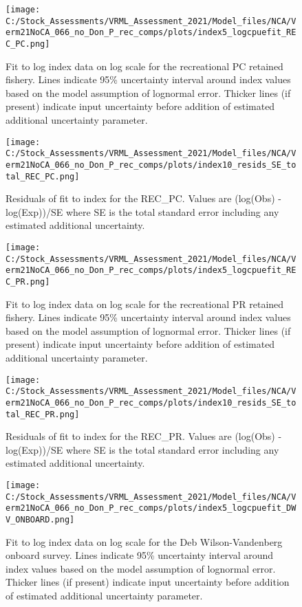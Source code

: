 \documentclass[11pt,
  english,
  a4paper,
]{article}
\begin{document}
\begin{figure}
\centering
\texttt{[image: C:/Stock\_Assessments/VRML\_Assessment\_2021/Model\_files/NCA/Verm21NoCA\_066\_no\_Don\_P\_rec\_comps/plots/index5\_logcpuefit\_REC\_PC.png]}
\caption{Fit to log index data on log scale for the recreational PC retained fishery. Lines indicate 95\% uncertainty interval around index values based on the model assumption of lognormal error. Thicker lines (if present) indicate input uncertainty before addition of estimated additional uncertainty parameter.\label{fig:log-cpue-REC-PC}}
\end{figure}

\begin{figure}
\centering
\texttt{[image: C:/Stock\_Assessments/VRML\_Assessment\_2021/Model\_files/NCA/Verm21NoCA\_066\_no\_Don\_P\_rec\_comps/plots/index10\_resids\_SE\_total\_REC\_PC.png]}
\caption{Residuals of fit to index for the REC\_PC. Values are (log(Obs) - log(Exp))/SE where SE is the total standard error including any estimated additional uncertainty.\label{fig:cpue-resid-REC-PC}}
\end{figure}

\begin{figure}
\centering
\texttt{[image: C:/Stock\_Assessments/VRML\_Assessment\_2021/Model\_files/NCA/Verm21NoCA\_066\_no\_Don\_P\_rec\_comps/plots/index5\_logcpuefit\_REC\_PR.png]}
\caption{Fit to log index data on log scale for the recreational PR retained fishery. Lines indicate 95\% uncertainty interval around index values based on the model assumption of lognormal error. Thicker lines (if present) indicate input uncertainty before addition of estimated additional uncertainty parameter.\label{fig:log-cpue-REC-PR}}
\end{figure}

\begin{figure}
\centering
\texttt{[image: C:/Stock\_Assessments/VRML\_Assessment\_2021/Model\_files/NCA/Verm21NoCA\_066\_no\_Don\_P\_rec\_comps/plots/index10\_resids\_SE\_total\_REC\_PR.png]}
\caption{Residuals of fit to index for the REC\_PR. Values are (log(Obs) - log(Exp))/SE where SE is the total standard error including any estimated additional uncertainty.\label{fig:cpue-resid-REC-PR}}
\end{figure}

\begin{figure}
\centering
\texttt{[image: C:/Stock\_Assessments/VRML\_Assessment\_2021/Model\_files/NCA/Verm21NoCA\_066\_no\_Don\_P\_rec\_comps/plots/index5\_logcpuefit\_DWV\_ONBOARD.png]}
\caption{Fit to log index data on log scale for the Deb Wilson-Vandenberg onboard survey. Lines indicate 95\% uncertainty interval around index values based on the model assumption of lognormal error. Thicker lines (if present) indicate input uncertainty before addition of estimated additional uncertainty parameter.\label{fig:log-cpue-DWV-ONBOARD}}
\end{figure}
\end{document}
